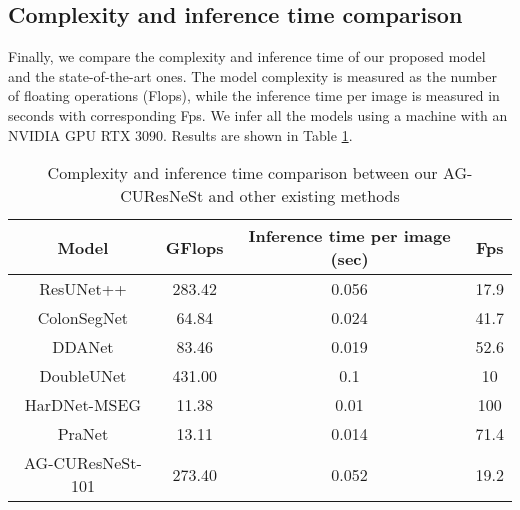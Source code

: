 \documentclass[review, sort&compress]{elsarticle}
\begin{document}
\subsection{Complexity and inference time comparison}

Finally, we compare the complexity and inference time of our proposed model and the state-of-the-art ones. The model complexity is measured as the number of floating operations (Flops), while the inference time per image is measured in seconds with corresponding Fps. We infer all the models using a machine with an NVIDIA GPU RTX 3090. Results are shown in Table \ref{tab_size}.

\begin{table}
\centering
\caption{Complexity and inference time comparison between our AG-CUResNeSt and other existing methods}
\begin{tabular}{c|c c c}
\hline

Model & GFlops & Inference time per image (sec) & Fps \\
\hline
\hline

ResUNet++ \cite{jha2019resunet++} & 283.42 & 0.056 & 17.9\\

ColonSegNet \cite{jha2021real} &  64.84 & 0.024 & 41.7\\

DDANet \cite{tomar2020ddanet} & 83.46 & 0.019 & 52.6\\

DoubleUNet \cite{jha2020doubleu} & 431.00 & 0.1 & 10 \\

HarDNet-MSEG \cite{huang2021hardnet} & 11.38 & 0.01 & 100 \\

PraNet \cite{fan2020pranet} & 13.11 & 0.014 & 71.4 \\

AG-CUResNeSt-101 & 273.40 & 0.052 & 19.2 \\
\hline
\end{tabular}
\label{tab_size}
\end{table}
\end{document}
